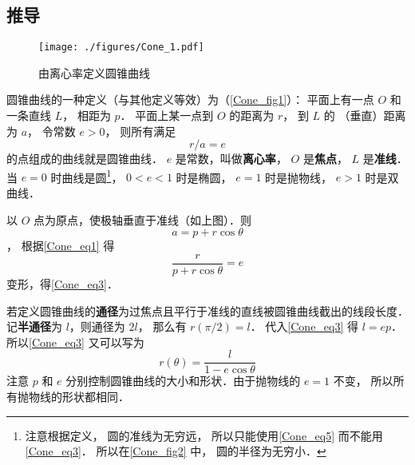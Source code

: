\subsection{推导}


\begin{figure}[ht]
\centering
\texttt{[image: ./figures/Cone\_1.pdf]}
\caption{由离心率定义圆锥曲线}\label{Cone_fig1}
\end{figure}

圆锥曲线的一种定义（与其他定义等效）为（\autoref{Cone_fig1}）：
平面上有一点 $O$ 和一条直线 $L$， 相距为 $p$． 
平面上某一点到 $O$ 的距离为 $r$， 到 $L$ 的
（垂直）距离为 $a$， 令常数 $e > 0$， 则所有满足
\begin{equation}\label{Cone_eq1}
r/a = e
\end{equation}
的点组成的曲线就是圆锥曲线． $e$ 是常数，叫做\textbf{离心率}， $O$ 是\textbf{焦点}， $L$ 是\textbf{准线}． 当 $e = 0$ 时曲线是圆\footnote{注意根据定义， 圆的准线为无穷远， 所以只能使用\autoref{Cone_eq5} 而不能用\autoref{Cone_eq3}． 所以在\autoref{Cone_fig2} 中， 圆的半径为无穷小．}， $0 < e < 1$ 时是椭圆， $e = 1$ 时是抛物线， $e > 1$ 时是双曲线．

以 $O$ 点为原点，使极轴垂直于准线（如上图）．则 $$a = p + r \cos \theta $$， 根据\autoref{Cone_eq1} 得
\begin{equation}\label{Cone_eq2}
\frac{r}{p + r \cos \theta } = e
\end{equation}
变形，得\autoref{Cone_eq3}．


若定义圆锥曲线的\textbf{通径}为过焦点且平行于准线的直线被圆锥曲线截出的线段长度． 记\textbf{半通径}为 $l$，则通径为 $2l$， 那么有 $r(\pi /2) = l$． 代入\autoref{Cone_eq3} 得 $l = ep$． 所以\autoref{Cone_eq3} 又可以写为
\begin{equation}\label{Cone_eq4}
r(\theta)  = \frac{l}{1 - e\cos \theta }
\end{equation}
注意 $p$ 和 $e$ 分别控制圆锥曲线的大小和形状．由于抛物线的 $e = 1$ 不变， 所以所有抛物线的形状都相同．
